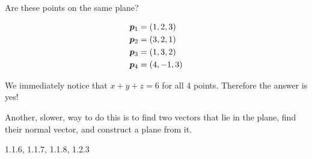 \documentclass[11pt]{article}
\begin{document}
\begin{example}
  
  Are these points on the same plane?

  \begin{align*}
    \bm{p}_1   &=\left ( 1, 2, 3 \right) \\
    \bm{p}_2 &=\left ( 3, 2, 1 \right) \\
    \bm{p}_3 &=\left ( 1, 3, 2 \right) \\
    \bm{p}_4 &=\left ( 4, -1, 3 \right) \\
  \end{align*}

  We immediately notice that $x+y+z=6$ for all 4 points.
  Therefore the answer is yes!

  Another, slower, way to do this is to find two vectors that lie in the plane, find their normal vector, and construct a plane from it.
\end{example}



1.1.6, 1.1.7, 1.1.8, 1.2.3
























\end{document}
